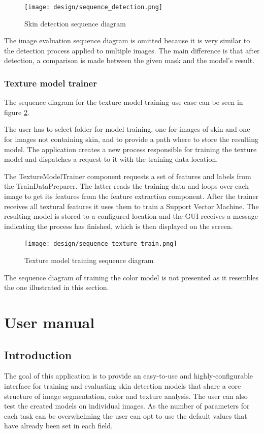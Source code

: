\documentclass[12pt]{report}
\begin{document}
	\begin{figure}[h!]
		\centering
		\texttt{[image: design/sequence\_detection.png]}
		\caption{Skin detection sequence diagram}
		\label{fig:detection_sequence}
	\end{figure}

	The image evaluation sequence diagram is omitted because it is very similar to the detection process applied to multiple images. The main difference is that after detection, a comparison is made between the given mask and the model's result.
	
	\clearpage
	\subsubsection{Texture model trainer}
	The sequence diagram for the texture model training use case can be seen in figure \ref{fig:texture_sequence}. 
	
	The user has to select folder for model training, one for images of skin and one for images not containing skin, and to provide a path where to store the resulting model. The application creates a new process responsible for training the texture model and dispatches a request to it with the training data location.
	
	The TextureModelTrainer component requests a set of features and labels from the TrainDataPreparer. The latter reads the training data and loops over each image to get its features from the  feature extraction component. After the trainer receives all textural features it uses them to train a Support Vector Machine. The resulting model is stored to a configured location and the GUI receives a message indicating the process has finished, which is then displayed on the screen.
	
	\begin{figure}[h!]
		\centering
		\texttt{[image: design/sequence\_texture\_train.png]}
		\caption{Texture model training sequence diagram}
		\label{fig:texture_sequence}
	\end{figure}
	
	The sequence diagram of training the color model is not presented as it resembles the one illustrated in this section.
	
	\clearpage
	\section{User manual}
	\subsection{Introduction}
	The goal of this application is to provide an easy-to-use and highly-configurable interface for training and evaluating skin detection models that share a core structure of image segmentation, color and texture analysis. The user can also test the created models on individual images. As the number of parameters for each task can be overwhelming the user can opt to use the default values that have already been set in each field.
	
\end{document}
